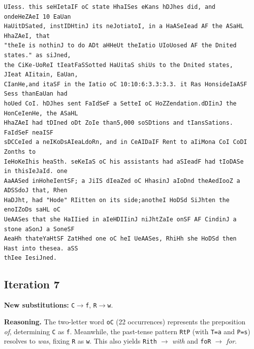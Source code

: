 \documentclass[11pt,a4paper]{article}
\begin{document}
\begin{lstlisting}[style=ciphertext,caption={Complete text after iteration 6}]
UIess. this seHIetaIF oC state HhaISes eKans hDJhes did, and ondeHeZAeI 10 EaUan
HaUitDSated, instIDHtinJ its neJotiatoI, in a HaASeIead AF the ASaHL HhaZAeI, that
"theIe is nothinJ to do ADt aHHeUt theIatio UIoUosed AF the Dnited states." as siJned,
the CiKe-UoReI tIeatFaSSotted HaUitaS shiUs to the Dnited states, JIeat AIitain, EaUan,
CIanHe,and itaSF in the Iatio oC 10:10:6:3.3:3.3. it Ras HonsideIaASF Sess thanEaUan had
hoUed CoI. hDJhes sent FaIdSeF a SetteI oC HoZZendation.dDIinJ the HonCeIenHe, the ASaHL
HhaZAeI had tDIned oDt ZoIe than5,000 soSDtions and tIansSations. FaIdSeF neaISF
sDCCeIed a neIKoDsAIeaLdoRn, and in CeAIDaIF Rent to aIiMona CoI CoDI Zonths to
IeHoKeIhis heaSth. seKeIaS oC his assistants had aSIeadF had tIoDASe in thisIeJaId. one
AaAASed inHoheIentSF; a JiIS dIeaZed oC HhasinJ aIoDnd theAedIooZ a ADSSdoJ that, Rhen
HaDJht, had "Hode" RIitten on its side;anotheI HoDSd SiJhten the enoIZoDs saHL oC
UeAASes that she HaIIied in aIeHDIIinJ niJhtZaIe onSF AF CindinJ a stone aSonJ a SoneSF
AeaHh thateYaHtSF ZatHhed one oC heI UeAASes, RhiHh she HoDSd then Hast into thesea. aSS
thIee IesiJned.
\end{lstlisting}

\newpage
\subsection{Iteration 7}

\noindent\textbf{New substitutions:} \texttt{C}$\rightarrow$\texttt{f}, \texttt{R}$\rightarrow$\texttt{w}.\par
\smallskip
\noindent\textbf{Reasoning.} The two-letter word \texttt{oC} (22 occurrences) represents the preposition \textit{of}, determining \texttt{C} as \texttt{f}. Meanwhile, the past-tense pattern \texttt{RtP} (with \texttt{T=a} and \texttt{P=s}) resolves to \textit{was}, fixing \texttt{R} as \texttt{w}. This also yields \texttt{Rith} $\rightarrow$ \textit{with} and \texttt{foR} $\rightarrow$ \textit{for}.
\end{document}
